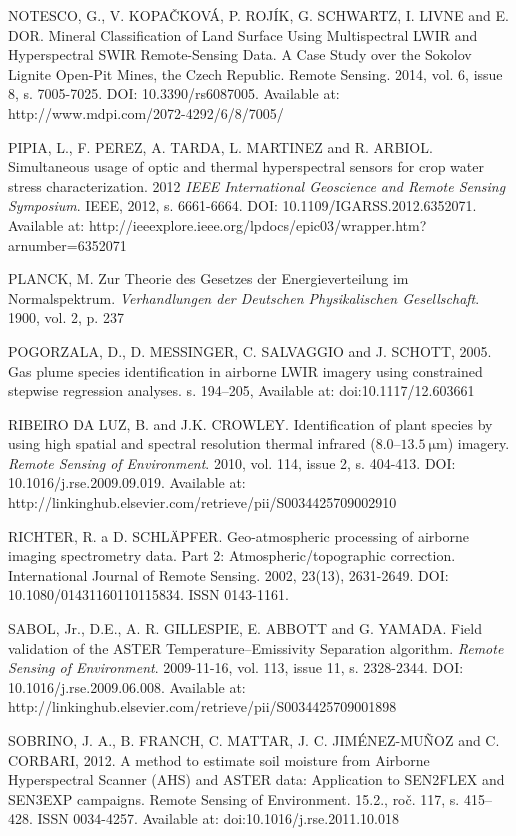 \begin{thebibliography}{10}
 NOTESCO, G., V. KOPAČKOVÁ, P. ROJÍK, G. SCHWARTZ, I. LIVNE and E. DOR. Mineral Classification of Land Surface Using Multispectral LWIR and Hyperspectral SWIR Remote-Sensing Data. A Case Study over the Sokolov Lignite Open-Pit Mines, the Czech Republic. Remote Sensing. 2014, vol. 6, issue 8, s. 7005-7025. DOI: 10.3390/rs6087005. Available at: http://www.mdpi.com/2072-4292/6/8/7005/

 PIPIA, L., F. PEREZ, A. TARDA, L. MARTINEZ and R. ARBIOL. Simultaneous usage of optic and thermal hyperspectral sensors for crop water stress characterization. 2012 \textit{IEEE International Geoscience and Remote Sensing Symposium}. IEEE, 2012, s. 6661-6664. DOI: 10.1109/IGARSS.2012.6352071. Available at: http://ieeexplore.ieee.org/lpdocs/epic03/wrapper.htm?arnumber=6352071 

 PLANCK, M. Zur Theorie des Gesetzes der Energieverteilung im Normalspektrum. \textit{Verhandlungen der Deutschen Physikalischen Gesellschaft}. 1900, vol. 2, p. 237

 POGORZALA, D., D. MESSINGER, C. SALVAGGIO and J. SCHOTT, 2005. Gas plume species identification in airborne LWIR imagery using constrained stepwise regression analyses. s. 194–205, Available at: doi:10.1117/12.603661

 RIBEIRO DA LUZ, B. and J.K. CROWLEY. Identification of plant species by using high spatial and spectral resolution thermal infrared (8.0–$\SI{13.5}{\micro\meter}$) imagery. \textit{Remote Sensing of Environment}. 2010, vol. 114, issue 2, s. 404-413. DOI: 10.1016/j.rse.2009.09.019. Available at: http://linkinghub.elsevier.com/retrieve/pii/S0034425709002910

 RICHTER, R. a D. SCHLÄPFER. Geo-atmospheric processing of airborne imaging spectrometry data. Part 2: Atmospheric/topographic correction. International Journal of Remote Sensing. 2002, 23(13), 2631-2649. DOI: 10.1080/01431160110115834. ISSN 0143-1161.

 SABOL, Jr., D.E., A. R. GILLESPIE, E. ABBOTT and G. YAMADA. Field validation of the ASTER Temperature–Emissivity Separation algorithm. \textit{Remote Sensing of Environment}. 2009-11-16, vol. 113, issue 11, s. 2328-2344. DOI: 10.1016/j.rse.2009.06.008. Available at: http://linkinghub.elsevier.com/retrieve/pii/S0034425709001898

 SOBRINO, J. A., B. FRANCH, C. MATTAR, J. C. JIMÉNEZ-MUÑOZ and C. CORBARI, 2012. A method to estimate soil moisture from Airborne Hyperspectral Scanner (AHS) and ASTER data: Application to SEN2FLEX and SEN3EXP campaigns. Remote Sensing of Environment. 15.2., roč. 117, s. 415–428. ISSN 0034-4257. Available at: doi:10.1016/j.rse.2011.10.018


\end{thebibliography}
